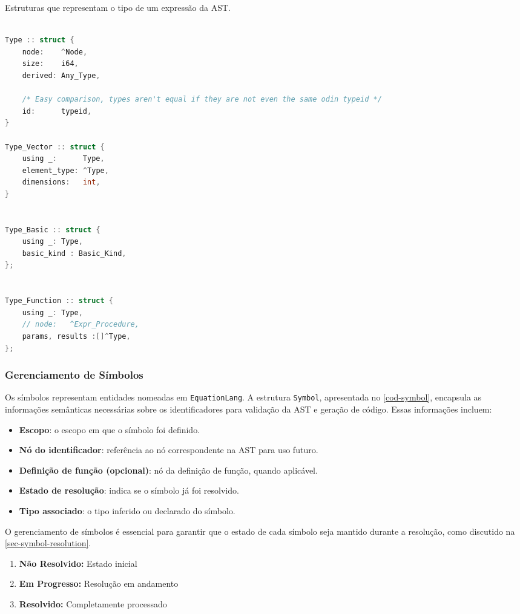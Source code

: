 \begin{codigo}[htb]
    \caption{\small Estruturas que representam o tipo de um expressão da AST. }
    \label{cod-types-structs}
\begin{lstlisting}[language=C, numbers=none, frame=none, inputencoding=latin1]

Type :: struct {
    node:    ^Node,
    size:    i64,
    derived: Any_Type,

    /* Easy comparison, types aren't equal if they are not even the same odin typeid */
    id:      typeid,
}

Type_Vector :: struct {
    using _:      Type,
    element_type: ^Type,
    dimensions:   int,
}


Type_Basic :: struct {
    using _: Type,
    basic_kind : Basic_Kind,
};


Type_Function :: struct {
    using _: Type,
    // node:   ^Expr_Procedure,
    params, results :[]^Type,
};

\end{lstlisting}
\end{codigo}


\subsubsection{Gerenciamento de Símbolos}

Os símbolos representam entidades nomeadas em \texttt{EquationLang}. A estrutura \texttt{Symbol}, apresentada no \autoref{cod-symbol}, encapsula as informações semânticas necessárias sobre os identificadores para validação da AST e geração de código. Essas informações incluem: \begin{itemize} \item \textbf{Escopo}: o escopo em que o símbolo foi definido. \item \textbf{Nó do identificador}: referência ao nó correspondente na AST para uso futuro. \item \textbf{Definição de função (opcional)}: nó da definição de função, quando aplicável. \item \textbf{Estado de resolução}: indica se o símbolo já foi resolvido. \item \textbf{Tipo associado}: o tipo inferido ou declarado do símbolo. \end{itemize}

O gerenciamento de símbolos é essencial para garantir que o estado de cada símbolo seja mantido durante a resolução, como discutido na \autoref{sec-symbol-resolution}.
\begin{enumerate}
    \item \textbf{Não Resolvido:} Estado inicial
    \item \textbf{Em Progresso:} Resolução em andamento
    \item \textbf{Resolvido:} Completamente processado
\end{enumerate}

